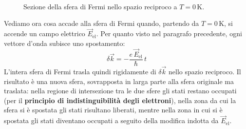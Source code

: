 \begin{figure}[htbp]
    \centering
    \caption{Sezione della sfera di Fermi nello spazio reciproco a \(T = 0\,\text{K}\).}
    \label{fig:sfera_fermi}
\end{figure}

Vediamo ora cosa accade alla sfera di Fermi quando, partendo da \(T = 0\,\text{K}\), si accende un campo elettrico \(\vec{E}_{\text{el}}\). Per quanto visto nel paragrafo precedente, ogni vettore d'onda subisce uno spostamento:
\begin{equation}
    \delta \vec{k} = -\frac{e\, \vec{E}_{\text{el}}}{\hbar}\, t
\end{equation}
L'intera sfera di Fermi trasla quindi rigidamente di \(\delta \vec{k}\) nello spazio reciproco. Il risultato è una nuova sfera, sovrapposta in larga parte alla sfera originale ma traslata: nella regione di intersezione tra le due sfere gli stati restano occupati (per il \textbf{principio di indistinguibilità degli elettroni}), nella zona da cui la sfera si è spostata gli stati risultano liberati, mentre nella zona in cui si è spostata gli stati diventano occupati a seguito della modifica indotta da \(\vec{E}_{\text{el}}\).

